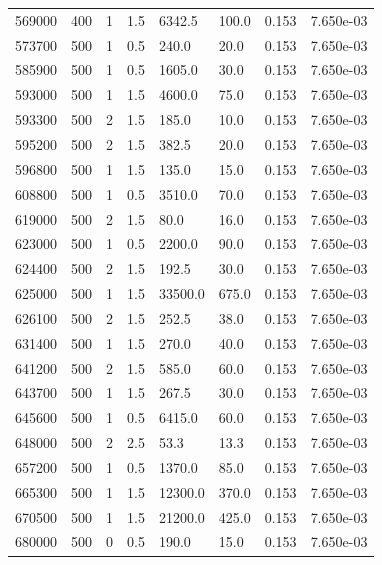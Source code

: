 \documentclass[preview]{standalone}
\begin{document}
{{{{\begin{tabular}{L{1.2cm}C{1.2cm} C{0.3cm}C{0.5cm} C{1.4cm}C{1.4cm} C{1.4cm}C{1.4cm}}
  569000  &   400  & 1     & 1.5 &  6342.5  & 100.0  & 0.153 &  7.650e-03   \\ 
  573700  &   500  & 1     & 0.5 &  240.0  & 20.0  & 0.153 &  7.650e-03   \\ 
  585900  &   500  & 1     & 0.5 &  1605.0  & 30.0  & 0.153 &  7.650e-03   \\ 
  593000  &   500  & 1     & 1.5 &  4600.0  & 75.0  & 0.153 &  7.650e-03   \\ 
  593300  &   500  & 2     & 1.5 &  185.0  & 10.0  & 0.153 &  7.650e-03   \\ 
  595200  &   500  & 2     & 1.5 &  382.5  & 20.0  & 0.153 &  7.650e-03   \\ 
  596800  &   500  & 1     & 1.5 &  135.0  & 15.0  & 0.153 &  7.650e-03   \\ 
  608800  &   500  & 1     & 0.5 &  3510.0  & 70.0  & 0.153 &  7.650e-03   \\ 
  619000  &   500  & 2     & 1.5 &  80.0  & 16.0  & 0.153 &  7.650e-03   \\ 
  623000  &   500  & 1     & 0.5 &  2200.0  & 90.0  & 0.153 &  7.650e-03   \\ 
  624400  &   500  & 2     & 1.5 &  192.5  & 30.0  & 0.153 &  7.650e-03   \\ 
  625000  &   500  & 1     & 1.5 &  33500.0  & 675.0  & 0.153 &  7.650e-03   \\ 
  626100  &   500  & 2     & 1.5 &  252.5  & 38.0  & 0.153 &  7.650e-03   \\ 
  631400  &   500  & 1     & 1.5 &  270.0  & 40.0  & 0.153 &  7.650e-03   \\ 
  641200  &   500  & 2     & 1.5 &  585.0  & 60.0  & 0.153 &  7.650e-03   \\ 
  643700  &   500  & 1     & 1.5 &  267.5  & 30.0  & 0.153 &  7.650e-03   \\ 
  645600  &   500  & 1     & 0.5 &  6415.0  & 60.0  & 0.153 &  7.650e-03   \\ 
  648000  &   500  & 2     & 2.5 &  53.3  & 13.3  & 0.153 &  7.650e-03   \\ 
  657200  &   500  & 1     & 0.5 &  1370.0  & 85.0  & 0.153 &  7.650e-03   \\ 
  665300  &   500  & 1     & 1.5 &  12300.0  & 370.0  & 0.153 &  7.650e-03   \\ 
  670500  &   500  & 1     & 1.5 &  21200.0  & 425.0  & 0.153 &  7.650e-03   \\ 
  680000  &   500  & 0     & 0.5 &  190.0  & 15.0  & 0.153 &  7.650e-03   \\ 

\end{tabular}}}}}
\end{document}
